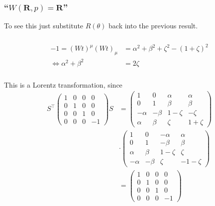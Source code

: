 \subsubsection{\enquote{$W(\mathbf{R},p)=\mathbf{R}$} }
To see this just substitute $R(\theta)$ back into the previous result.

\subsubsection{ }

\begin{align*} 
	-1=\left(Wt\right)^\mu \left(W t\right)_\mu &=\alpha^2+\beta^2+\zeta^2-(1+\zeta)^2\\
	\Leftrightarrow\alpha^2 + \beta^2&=2\zeta
\end{align*}

\subsubsection{ }
This is a Lorentz transformation, since
\begin{align*} 
	S^\top \left(\begin{array}{cccc}
		1&  0&  0&  0\\
		0&  1&  0&  0\\
		0&  0&  1&  0\\
		0&  0&  0& -1
	\end{array}\right) S &=
	\left(\begin{array}{cccc}
		1&  0&  \alpha&  \alpha\\
		0&  1&  \beta&  \beta\\
		-\alpha&  -\beta&  1-\zeta&  -\zeta\\
		\alpha&  \beta&  \zeta& 1+ \zeta
	\end{array}\right)\\
&\cdot\left(\begin{array}{cccc}
	1&  0&  -\alpha&  \alpha\\
	0&  1&  -\beta&  \beta\\
	\alpha&  \beta&  1-\zeta&  \zeta\\
	-\alpha&  -\beta&  \zeta& -1- \zeta
\end{array}\right)\\
&=\left(\begin{array}{cccc}
	1&  0&  0&  0\\
	0&  1&  0&  0\\
	0&  0&  1&  0\\
	0&  0&  0& -1
\end{array}\right)
\end{align*}

